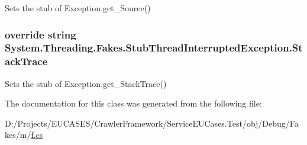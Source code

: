 Sets the stub of Exception.\-get\-\_\-\-Source()

\hypertarget{class_system_1_1_threading_1_1_fakes_1_1_stub_thread_interrupted_exception_a61a2916f078392a8bc510ed7a37c4cff}{
\subsubsection[{Stack\-Trace}]{\setlength{\rightskip}{0pt plus 5cm}override string System.\-Threading.\-Fakes.\-Stub\-Thread\-Interrupted\-Exception.\-Stack\-Trace\hspace{0.3cm}{\ttfamily [get]}}}\label{class_system_1_1_threading_1_1_fakes_1_1_stub_thread_interrupted_exception_a61a2916f078392a8bc510ed7a37c4cff}


Sets the stub of Exception.\-get\-\_\-\-Stack\-Trace()



The documentation for this class was generated from the following file\-:\begin{DoxyCompactItemize}
\item 
D\-:/\-Projects/\-E\-U\-C\-A\-S\-E\-S/\-Crawler\-Framework/\-Service\-E\-U\-Cases.\-Test/obj/\-Debug/\-Fakes/m/\hyperlink{m_2f_8cs}{f.\-cs}\end{DoxyCompactItemize}
